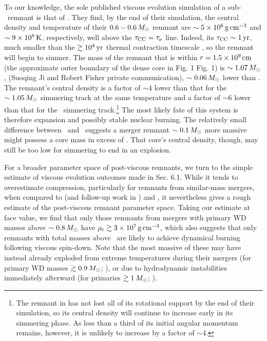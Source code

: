 To our knowledge, the sole published viscous evolution simulation of a sub-\Mch\ remnant is that of \cite{ji+13}.  They find, by the end of their simulation, the central density and temperature of their $0.6 - 0.6\,\Msun$ remnant are $\sim5\times10^6\,\gcc$ and $\sim9\times10^8\,\mathrm{K}$, respectively, well above the $\taucc = \taunu$ line.  Indeed, its $\taucc \sim 1\,\mrm{yr}$, much smaller than the $\gtrsim 10^4\,\mathrm{yr}$ thermal contraction timescale \citep{shen+12}, so the remnant will begin to simmer.  The mass of the remnant that is within $r = 1.5\times10^9\,\mathrm{cm}$ (the approximate outer boundary of the dense core in Fig. 1 \citealt{ji+13} Fig. 1) is $\sim1.07\,\Msun$, (Suoqing Ji and Robert Fisher private communication), $\sim0.06\,\Msun$ lower than \Mcrit.  The remnant's central density is a factor of $\sim4$ lower than that for the $\sim1.05\,\Msun$ simmering track at the same temperature and a factor of $\sim6$ lower than that for the \Mcrit\ simmering track.\footnote{The remnant in \citep{ji+13} has not lost all of its rotational support by the end of their simulation, so its central density will continue to increase early in its simmering phase.  As less than a third of its initial angular momentum remains, however, it is unlikely to increase by a factor of $\sim4$.}  The most likely fate of this system is therefore expansion and possibly stable nuclear burning.  The relatively small difference between \Mc\ and \Mcrit\ suggests a merger remnant $\sim0.1\,\Msun$ more massive might possess a core mass in excess of \Mcrit.  That core's central density, though, may still be too low for simmering to end in an explosion.



For a broader parameter space of post-viscous remnants, we turn to the simple estimate of viscous evolution outcomes made in \citeal{zhu+13} Sec. 6.1.  While it tends to overestimate compression, particularly for remnants from similar-mass mergers, when compared to \citeauthor{schw+12} (and follow-up work in \citealt{rask+14}) and \cite{ji+13}, it nevertheless gives a rough estimate of the post-viscous remnant parameter space.  Taking our estimate at face value, we find that only those remnants from mergers with primary WD masses above $\sim0.8\,\Msun$ have $\rhoc \gtrsim 3\times10^7\,\gcc$, which also suggests that only remnants with total masses above \Mch\ are likely to achieve dynamical burning following viscous spin-down.  Note that the most massive of these may have instead already exploded from extreme temperatures during their mergers (for primary WD masses $\gtrsim0.9\,\Msun$; \citealt{pakm+10,pakm+11}), or due to hydrodynamic instabilities immediately afterward (for primaries $\gtrsim1\,\Msun$; \citealt{kash+15}).

